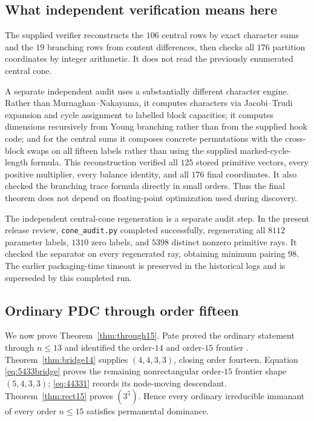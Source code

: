 \documentclass[11pt]{article}
\theoremstyle{definition}
\begin{document}
\subsection{What independent verification means here}
The supplied verifier reconstructs the $106$ central rows by exact character sums and the $19$ branching rows from content differences, then checks all $176$ partition coordinates by integer arithmetic.  It does not read the previously enumerated central cone.

A separate independent audit uses a substantially different character engine.  Rather than Murnaghan--Nakayama, it computes characters via Jacobi--Trudi expansion and cycle assignment to labelled block capacities; it computes dimensions recursively from Young branching rather than from the supplied hook code; and for the central sums it composes concrete permutations with the cross-block swaps on all fifteen labels rather than using the supplied marked-cycle-length formula.  This reconstruction verified all $125$ stored primitive vectors, every positive multiplier, every balance identity, and all $176$ final coordinates.  It also checked the branching trace formula directly in small orders.  Thus the final theorem does not depend on floating-point optimization used during discovery.

The independent central-cone regeneration is a separate audit step.  In the present release review, \texttt{cone\_audit.py} completed successfully, regenerating all $8112$ parameter labels, $1310$ zero labels, and $5398$ distinct nonzero primitive rays.  It checked the separator on every regenerated ray, obtaining minimum pairing $98$.  The earlier packaging-time timeout is preserved in the historical logs and is superseded by this completed run.

\subsection{Ordinary PDC through order fifteen}
We now prove Theorem~\ref{thm:through15}.  Pate proved the ordinary statement through $n\le13$ and identified the order-$14$ and order-$15$ frontier \cite{Pate1999}.  Theorem~\ref{thm:bridge14} supplies $(4,4,3,3)$, closing order fourteen.  Equation \eqref{eq:5433bridge} proves the remaining nonrectangular order-$15$ frontier shape $(5,4,3,3)$; \eqref{eq:44331} records its node-moving descendant.  Theorem~\ref{thm:rect15} proves $(3^5)$.  Hence every ordinary irreducible immanant of every order $n\le15$ satisfies permanental dominance.
\end{document}
